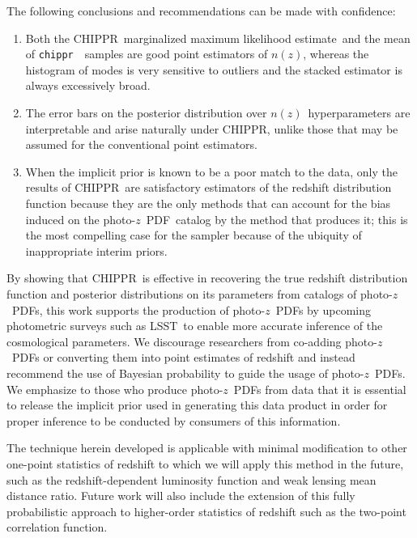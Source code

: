\documentclass[iop]{emulateapj}
\newcommand{\project}[1]{{\textsc{#1}}}
\newcommand{\lsst}{\project{LSST}}
\newcommand{\Chippr}{\project{CHIPPR}}
\newcommand{\repo}[1]{{\texttt{#1}}~}
\newcommand{\chippr}{\repo{chippr}}
\newcommand{\nz}{$n(z)$}
\newcommand{\pz}{photo-$z$~}
\newcommand{\pzpdf}{\pz PDF}
\newcommand{\mmle}{marginalized maximum likelihood estimate}
\begin{document}
The following conclusions and recommendations can be made with confidence:

\begin{enumerate}
	\item Both the \Chippr\ \mmle\ and the mean of \chippr\ samples are good point estimators of \nz, whereas the histogram of modes is very sensitive to outliers and the stacked estimator is always excessively broad.
	\item The error bars on the posterior distribution over \nz\ hyperparameters are interpretable and arise naturally under \Chippr, unlike those that may be assumed for the conventional point estimators.
	\item When the implicit prior is known to be a poor match to the data, only the results of \Chippr\ are satisfactory estimators of the redshift distribution function because they are the only methods that can account for the bias induced on the \pzpdf\ catalog by the method that produces it; this is the most compelling case for the sampler because of the ubiquity of inappropriate interim priors.
\end{enumerate}

By showing that \Chippr\ is effective in recovering the true redshift distribution function and posterior distributions on its parameters from catalogs of \pzpdf s, this work supports the production of \pzpdf s by upcoming photometric surveys such as \lsst\ to enable more accurate inference of the cosmological parameters.  
We discourage researchers from co-adding \pzpdf s or converting them into point estimates of redshift and instead recommend the use of Bayesian probability to guide the usage of \pzpdf s.  
We emphasize to those who produce \pzpdf s from data that it is essential to release the implicit prior used in generating this data product in order for proper inference to be conducted by consumers of this information.

The technique herein developed is applicable with minimal modification to other one-point statistics of redshift to which we will apply this method in the future, such as the redshift-dependent luminosity function and weak lensing mean distance ratio.  
Future work will also include the extension of this fully probabilistic approach to higher-order statistics of redshift such as the two-point correlation function.
\end{document}
